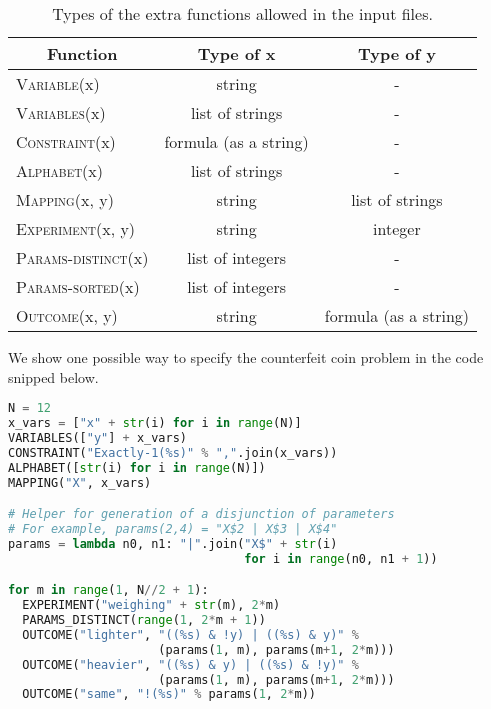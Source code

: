 \begin{table}
\begin{center}
\begin{tabular}{|l|c|c|}\hline
 \multicolumn{1}{|c|}{\textbf{Function}} & \textbf{Type of x} & \textbf{Type of y} \\\hline
\textsc{Variable}(x) & string & - \\
\textsc{Variables}(x) & list of strings & -\\
\textsc{Constraint}(x) & formula (as a string)& -\\
\textsc{Alphabet}(x) & list of strings & -\\
\textsc{Mapping}(x, y) & string & list of strings\\
\textsc{Experiment}(x, y) & string & integer \\
\textsc{Params-distinct}(x) & list of integers & -\\
\textsc{Params-sorted}(x) & list of integers & -\\
\textsc{Outcome}(x, y) & string & formula (as a string) \\\hline
\end{tabular}
\end{center}
\caption{Types of the extra functions allowed in the input files.}\label{tbl:lngpy}
\end{table}

\begin{example}
We show one possible way to specify the counterfeit coin problem in the
code snipped below.
\begin{lstlisting}[language=Python]
N = 12
x_vars = ["x" + str(i) for i in range(N)]
VARIABLES(["y"] + x_vars)
CONSTRAINT("Exactly-1(%s)" % ",".join(x_vars))
ALPHABET([str(i) for i in range(N)])
MAPPING("X", x_vars)

# Helper for generation of a disjunction of parameters
# For example, params(2,4) = "X$2 | X$3 | X$4"
params = lambda n0, n1: "|".join("X$" + str(i)
                                 for i in range(n0, n1 + 1))

for m in range(1, N//2 + 1):
  EXPERIMENT("weighing" + str(m), 2*m)
  PARAMS_DISTINCT(range(1, 2*m + 1))
  OUTCOME("lighter", "((%s) & !y) | ((%s) & y)" %
                     (params(1, m), params(m+1, 2*m)))
  OUTCOME("heavier", "((%s) & y) | ((%s) & !y)" %
                     (params(1, m), params(m+1, 2*m)))
  OUTCOME("same", "!(%s)" % params(1, 2*m))
\end{lstlisting}
\end{example}



